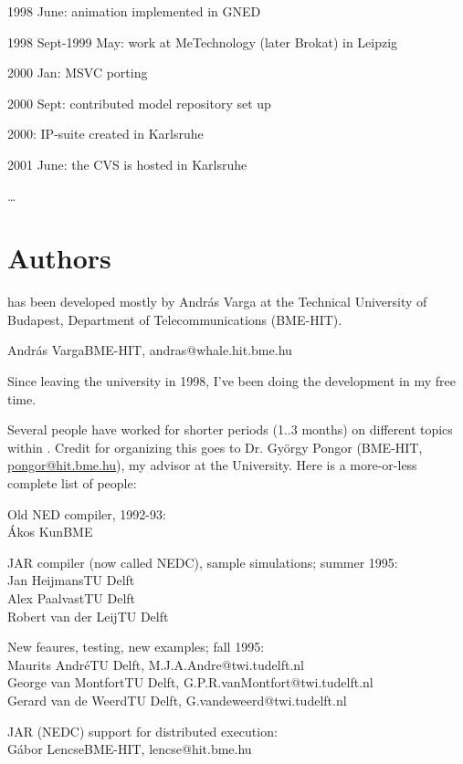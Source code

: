 1998 June: animation implemented in GNED

1998 Sept-1999 May: work at MeTechnology (later Brokat) in Leipzig

2000 Jan: MSVC porting

2000 Sept: contributed model repository set up

2000: IP-suite created in Karlsruhe

2001 June: the CVS is hosted in Karlsruhe

\dots





\section{Authors}

{\opp} has been developed mostly by Andr\'{a}s Varga at the Technical 
University of Budapest, Department of Telecommunications (BME-HIT). 

\tab Andr\'{a}s Varga\tab \tab BME-HIT, andras@whale.hit.bme.hu


Since leaving the university in 1998, I've been doing the development 
in my free time.

Several people have worked for shorter periods (1..3 months) 
on different topics within {\opp}. Credit for organizing this 
goes to Dr. Gy\"{o}rgy Pongor (BME-HIT, \href{mailto:pongor@hit.bme.hu}{pongor@hit.bme.hu}), my 
advisor at the University. Here is a more-or-less complete list 
of people:

Old NED compiler, 1992-93:\\
\tab \'{A}kos Kun\tab \tab BME

JAR compiler (now called NEDC), sample simulations; summer 1995:\\
\tab Jan Heijmans\tab \tab TU Delft\\
\tab Alex Paalvast\tab \tab TU Delft\\
\tab Robert van der Leij\tab TU Delft

New feaures, testing, new examples; fall 1995:\\
\tab Maurits Andr\'{e}\tab \tab TU Delft, M.J.A.Andre@twi.tudelft.nl\\
\tab George van Montfort\tab TU Delft, G.P.R.vanMontfort@twi.tudelft.nl\\
\tab Gerard van de Weerd\tab TU Delft, G.vandeweerd@twi.tudelft.nl

JAR (NEDC) support for distributed execution:\\
\tab G\'{a}bor Lencse\tab \tab BME-HIT, lencse@hit.bme.hu

